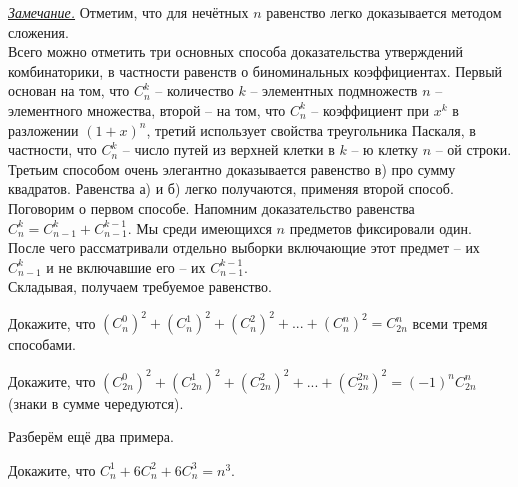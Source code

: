\textit{\underline{Замечание.}} Отметим, что для нечётных $n$ равенство легко доказывается методом сложения. 
\\ Всего можно отметить три основных способа доказательства утверждений комбинаторики, в частности равенств о биноминальных коэффициентах. Первый основан на том, что $C^k_n$ -- количество $k$ -- элементных подмножеств $n$ -- элементного множества, второй – на том, что $C^k_n$ -- коэффициент при $x^k$ в разложении $(1 + x)^n$, третий использует свойства треугольника Паскаля, в частности, что $C^k_n$ -- число путей из верхней клетки в $k$ -- ю клетку $n$ -- ой строки. Третьим способом очень элегантно доказывается равенство в) про сумму квадратов. Равенства а) и б) легко получаются, применяя второй способ. Поговорим о первом способе. Напомним доказательство равенства $C^k_n = C^k_{n - 1} + C^{k - 1}_{n - 1}$. Мы среди имеющихся $n$ предметов фиксировали один. После чего рассматривали отдельно выборки включающие этот предмет -- их $C^k_{n - 1}$ и не включавшие его -- их $C^{k - 1}_{n - 1}$.
\\ Складывая, получаем требуемое равенство.

\begin{thm}
    Докажите, что $(C^0_n)^2 + (C^1_n)^2 + (C^2_n)^2 + ... + (C^n_n)^2 = C^n_{2n}$ всеми тремя способами.\footnotemark
\end{thm}

\begin{thm}
    Докажите, что $(C^0_{2n})^2 + (C^1_{2n})^2 + (C^2_{2n})^2 + ... + (C^{2n}_{2n})^2 = (-1)^n C^n_{2n}$  (знаки в сумме чередуются).
\end{thm}

Разберём ещё два примера.

\begin{thm}
    Докажите, что $C^1_n + 6C^2_n + 6C^3_n = n^3$.
\end{thm}

